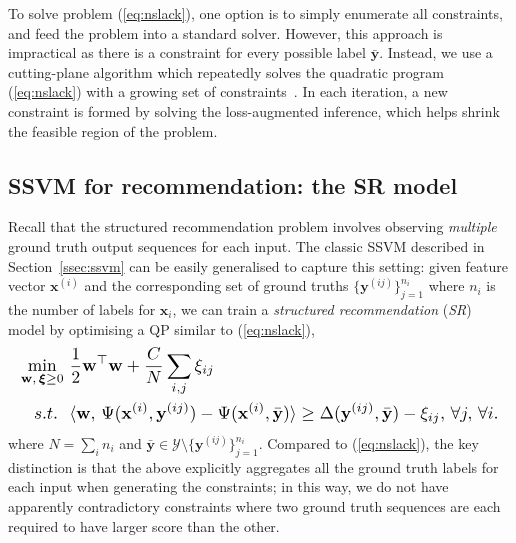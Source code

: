 To solve problem (\ref{eq:nslack}), one option is to simply enumerate all constraints, and feed the problem into a standard solver.
However, this approach is impractical as there is a constraint for every possible label $\bar{\mathbf{y}}$.
Instead, we use a cutting-plane algorithm which repeatedly solves the quadratic program (\ref{eq:nslack}) 
with a growing set of constraints~\cite{joachims2009predicting}.
In each iteration, a new constraint is formed by solving the loss-augmented inference, 
which helps shrink the feasible region of the problem.


\subsection{SSVM for recommendation: the SR model}
\label{ssec:sr}


Recall that the structured recommendation problem
involves observing \emph{multiple} ground truth output sequences for each input.
The classic SSVM described in Section~\ref{ssec:ssvm} can be easily generalised to capture this setting:
given feature vector $\mathbf{x}^{(i)}$ and the corresponding set of ground truths $\{\mathbf{y}^{(ij)}\}_{j=1}^{n_i}$
where $n_i$ is the number of labels for $\mathbf{x}_i$,
we can train a \emph{structured recommendation} (\emph{SR}) model by optimising a QP similar to (\ref{eq:nslack}),
\begin{equation}
\label{eq:nslack_ml}
\resizebox{0.99\linewidth}{!}{$
\begin{aligned}
\min_{\mathbf{w}, \, \bm{\xi} \ge 0} ~& \frac{1}{2} \mathbf{w}^\top \mathbf{w} + \frac{C}{N} \sum_{i,j} \xi_{ij} \\
s.t.~ ~& \langle \mathbf{w}, \, \Psi(\mathbf{x}^{(i)}, \mathbf{y}^{(ij)}) - \Psi(\mathbf{x}^{(i)}, \bar{\mathbf{y}}) \rangle \ge 
         \Delta(\mathbf{y}^{(ij)}, \bar{\mathbf{y}}) - \xi_{ij}, \, \forall j, \, \forall i.
\end{aligned}
$}
\end{equation}
where $N = \sum_i n_i$ and $\bar{\mathbf{y}} \in \mathcal{Y} \setminus \{\mathbf{y}^{(ij)}\}_{j=1}^{n_i}$.
Compared to (\ref{eq:nslack}), the key distinction is that the above
explicitly aggregates all the ground truth labels for each input when generating the constraints;
in this way, we do not have apparently contradictory constraints where
two ground truth sequences are each required to have larger score than the other.

